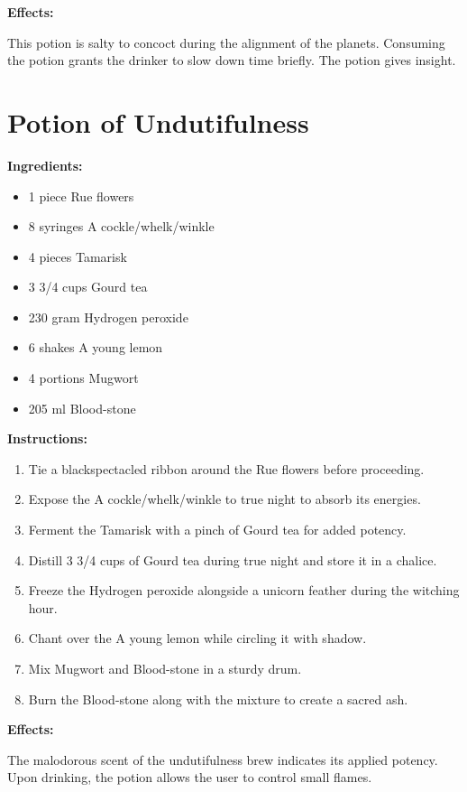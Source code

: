 \documentclass{article}
\begin{document}
\textbf{Effects:}

This potion is salty to concoct during the alignment of the planets. Consuming the potion grants the drinker to slow down time briefly. The potion gives insight.

\newpage
\section*{Potion of Undutifulness}

\textbf{Ingredients:}

\begin{itemize}
  \item 1 piece Rue flowers
  \item 8 syringes A cockle/whelk/winkle
  \item 4 pieces Tamarisk
  \item 3 3/4 cups Gourd tea
  \item 230 gram Hydrogen peroxide
  \item 6 shakes A young lemon
  \item 4 portions Mugwort
  \item 205 ml Blood-stone
\end{itemize}

\textbf{Instructions:}

\begin{enumerate}
  \item Tie a blackspectacled ribbon around the Rue flowers before proceeding.
  \item Expose the A cockle/whelk/winkle to true night to absorb its energies.
  \item Ferment the Tamarisk with a pinch of Gourd tea for added potency.
  \item Distill 3 3/4 cups of Gourd tea during true night and store it in a chalice.
  \item Freeze the Hydrogen peroxide alongside a unicorn feather during the witching hour.
  \item Chant over the A young lemon while circling it with shadow.
  \item Mix Mugwort and Blood-stone in a sturdy drum.
  \item Burn the Blood-stone along with the mixture to create a sacred ash.
\end{enumerate}

\textbf{Effects:}

The malodorous scent of the undutifulness brew indicates its applied potency. Upon drinking, the potion allows the user to control small flames.
\end{document}
